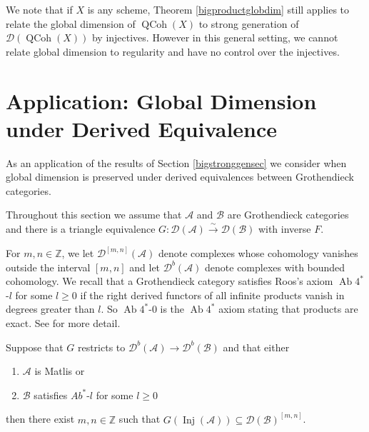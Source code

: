 \documentclass[12pt,oneside]{amsart}
\DeclareMathOperator*{\Inj}{Inj}
\DeclareMathOperator{\QCoh}{QCoh}
\DeclareMathOperator{\Ab}{Ab}
\begin{document}
\begin{remark}
We note that if $X$ is any scheme, Theorem \ref{bigproductglobdim} still applies to relate the global dimension of $\QCoh(X)$ to strong generation of $\mathcal{D}(\QCoh(X))$ by injectives. However in this general setting, we cannot relate global dimension to regularity and have no control over the injectives.
\end{remark}




\section{Application: Global Dimension under Derived Equivalence}
\label{derivedequivsec}

As an application of the results of Section \ref{bigstronggensec} we consider when global dimension is preserved under derived equivalences between Grothendieck categories.

\begin{remark}
Throughout this section we assume that $\mathcal{A}$ and $\mathcal{B}$ are Grothendieck categories and there is a triangle equivalence $G: \mathcal{D}(\mathcal{A}) \xrightarrow{\sim} \mathcal{D}(\mathcal{B})$ with inverse $F$.
\end{remark}

For $m,n \in \mathbb{Z}$, we let $\mathcal{D}^{[m,n]}(\mathcal{A})$ denote complexes whose cohomology vanishes outside the interval $[m,n]$ and let $\mathcal{D}^b(\mathcal{A})$ denote complexes with bounded cohomology.  We recall that a Grothendieck category satisfies Roos's axiom $\Ab4^\ast$-$l$ for some $l \geq 0$ if the right derived functors of all infinite products vanish in degrees greater than $l$. So $\Ab4^\ast$-$0$ is the $\Ab4^\ast$ axiom stating that products are exact. See \cite{Roo06} for more detail.


\begin{lemma} \label{bigmoritalemma0}
Suppose that $G$ restricts to $\mathcal{D}^b(\mathcal{A}) \to \mathcal{D}^b(\mathcal{B})$ and that either
\begin{enumerate}
\item $\mathcal{A}$ is Matlis or
\item $\mathcal{B}$ satisfies $Ab^\ast$-$l$ for some $l \geq 0$
\end{enumerate}
then there exist $m,n \in \mathbb{Z}$ such that $G(\Inj(\mathcal{A})) \subseteq \mathcal{D}(\mathcal{B})^{[m,n]}$. 
\end{lemma}
\end{document}
